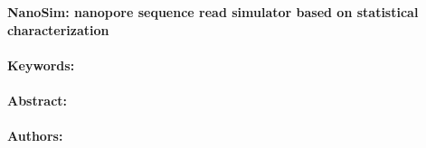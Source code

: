 \noindent
\large {\bf NanoSim: nanopore sequence read simulator based on statistical characterization} 


\normalsize 


\noindent \paragraph{Keywords:} 

\noindent \paragraph{Abstract:} 



\noindent \paragraph{Authors:} 


